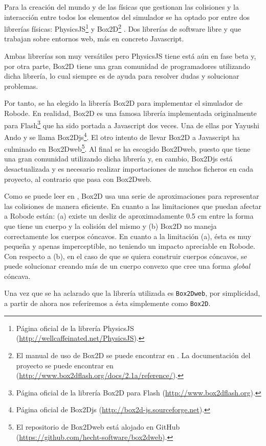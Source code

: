 Para la creación del mundo y de las físicas que gestionan las colisiones y la interacción entre todos los elementos del simulador se ha optado por entre dos librerías físicas: PhysicsJS\footnote{Página oficial de la librería PhysicsJS (\url{http://wellcaffeinated.net/PhysicsJS}).} y Box2D\footnote{El manual de uso de Box2D se puede encontrar en \cite{box2d-manual}. La documentación del proyecto se puede encontrar en (\url{http://www.box2dflash.org/docs/2.1a/reference/}).} \cite{box2d}. Dos librerías de software libre y que trabajan sobre entornos web, más en concreto Javascript.

Ambas librerías son muy versátiles pero PhysicsJS tiene está aún en fase beta y, por otra parte, Box2D tiene una gran comunidad de programadores utilizando dicha librería, lo cual siempre es de ayuda para resolver dudas y solucionar problemas.

Por tanto, se ha elegido la librería Box2D para implementar el simulador de Robode. En realidad, Box2D es una famosa librería implementada originalmente para Flash\footnote{Página oficial de la librería Box2D para Flash (\url{http://www.box2dflash.org}).} que ha sido portada a Javascript dos veces. Una de ellas por Yayushi Ando y se llama Box2Djs\footnote{Página oficial de Box2Djs (\url{http://box2d-js.sourceforge.net}).}. El otro intento de llevar Box2D a Javascript ha culminado en Box2Dweb\footnote{El repositorio de Box2Dweb está alojado en GitHub (\url{https://github.com/hecht-software/box2dweb}).}. Al final se ha escogido Box2Dweb, puesto que tiene una gran comunidad utilizando dicha librería y, en cambio, Box2Djs está desactualizada y es necesario realizar importaciones de muchos ficheros en cada proyecto, al contrario que pasa con Box2Dweb.

Como se puede leer en \cite[capítulo 13]{box2d-manual}, Box2D usa una serie de aproximaciones para representar las colisiones de manera eficiente. En cuanto a las limitaciones que puedan afectar a Robode están: (a) existe un desliz de aproximadamente 0.5 cm entre la forma que tiene un cuerpo y la colisión del mismo y (b) Box2D no maneja correctamente los cuerpos cóncavos.  En cuanto a la limitación (a), ésta es muy pequeña y apenas imperceptible, no teniendo un impacto apreciable en Robode. Con respecto a (b), en el caso de que se quiera construir cuerpos cóncavos, se puede solucionar creando más de un cuerpo convexo que cree una forma \emph{global} cóncava.

Una vez que se ha aclarado que la librería utilizada es \texttt{Box2Dweb}, por simplicidad, a partir de ahora nos referiremos a ésta simplemente como \texttt{Box2D}.

